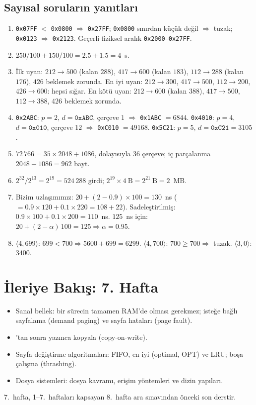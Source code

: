 \subsection*{Sayısal soruların yanıtları}
\begin{enumerate}[leftmargin=1.6em,start=14]
  \item \texttt{0x07FF} $<$ \texttt{0x0800} $\Rightarrow$ \texttt{0x27FF}; \texttt{0x0800} sınırdan küçük değil $\Rightarrow$ tuzak; \texttt{0x0123} $\Rightarrow$ \texttt{0x2123}. Geçerli fiziksel aralık \texttt{0x2000}--\texttt{0x27FF}.
  \item $250/100 + 150/100 = 2.5 + 1.5 = 4$~s.
  \item İlk uyan: $212\to500$ (kalan $288$), $417\to600$ (kalan $183$), $112\to288$ (kalan $176$), $426$ beklemek zorunda. En iyi uyan: $212\to300$, $417\to500$, $112\to200$, $426\to600$: hepsi sığar. En kötü uyan: $212\to600$ (kalan $388$), $417\to500$, $112\to388$, $426$ beklemek zorunda.
  \item \texttt{0x2ABC}: $p=2$, $d=\texttt{0xABC}$, çerçeve $1$ $\Rightarrow$ \texttt{0x1ABC} $= 6844$. \texttt{0x4010}: $p=4$, $d=\texttt{0x010}$, çerçeve $12$ $\Rightarrow$ \texttt{0xC010} $= 49168$. \texttt{0x5C21}: $p=5$, $d=\texttt{0xC21} = 3105$.
  \item $72\,766 = 35 \times 2048 + 1086$, dolayısıyla $36$ çerçeve; iç parçalanma $2048 - 1086 = 962$ bayt.
  \item $2^{32}/2^{13} = 2^{19} = 524\,288$ girdi; $2^{19}\times 4\ \text{B} = 2^{21}\ \text{B} = 2$~MB.
  \item Bizim uzlaşımımız: $20 + (2-0.9)\times100 = 130$~ns ($= 0.9\times120 + 0.1\times220 = 108 + 22$). Sadeleştirilmiş: $0.9\times100 + 0.1\times200 = 110$~ns. $125$~ns için: $20 + (2-\alpha)\,100 = 125 \Rightarrow \alpha = 0.95$.
  \item $\langle 4, 699\rangle$: $699 < 700 \Rightarrow 5600 + 699 = 6299$. $\langle 4, 700\rangle$: $700 \ge 700 \Rightarrow$ tuzak. $\langle 3, 0\rangle$: $3400$.
\end{enumerate}

\section{İleriye Bakış: 7. Hafta}

\begin{itemize}
  \item Sanal bellek: bir sürecin tamamen RAM'de olması gerekmez; isteğe bağlı sayfalama (demand paging) ve sayfa hataları (page fault).
  \item {}'tan sonra yazınca kopyala (copy-on-write).
  \item Sayfa değiştirme algoritmaları: FIFO, en iyi (optimal, OPT) ve LRU; boşa çalışma (thrashing).
  \item Dosya sistemleri: dosya kavramı, erişim yöntemleri ve dizin yapıları.
\end{itemize}
7.~hafta, 1--7.~haftaları kapsayan 8.~hafta ara sınavından önceki son derstir.

